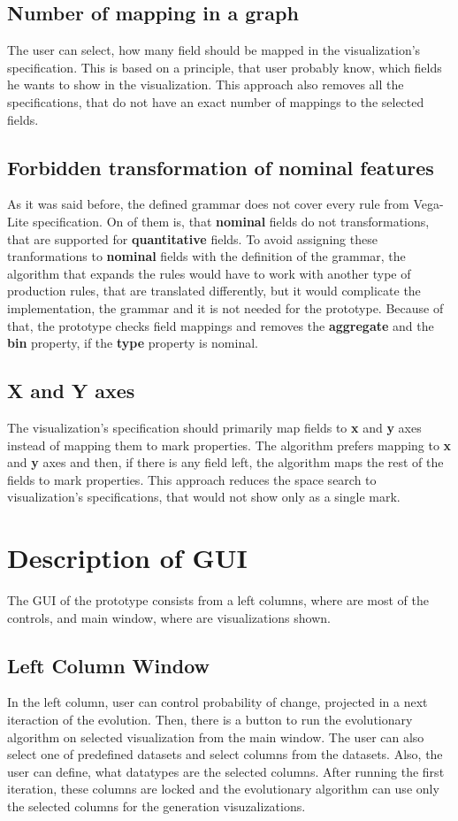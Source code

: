   \subsection{Number of mapping in a graph}
  The user can select, how many field should be mapped in the visualization's specification. This is based on a principle, that user probably know, which fields he wants to show in the visualization. This approach also removes all the specifications, that do not have an exact number of mappings to the selected fields.
  \subsection{Forbidden transformation of nominal features}
  As it was said before, the defined grammar does not cover every rule from Vega-Lite specification. On of them is, that \textbf{nominal} fields do not transformations, that are supported for \textbf{quantitative} fields. To avoid assigning these tranformations to \textbf{nominal} fields with the definition of the grammar, the algorithm that expands the rules would have to work with another type of production rules, that are translated differently, but it would complicate the implementation, the grammar and it is not needed for the prototype. Because of that, the prototype checks field mappings and removes the \textbf{aggregate} and the \textbf{bin} property, if the \textbf{type} property is nominal.
  \subsection{X and Y axes}
  The visualization's specification should primarily map fields to \textbf{x} and \textbf{y} axes instead of mapping them to mark properties. The algorithm prefers mapping to \textbf{x} and \textbf{y} axes and then, if there is any field left, the algorithm maps the rest of the fields to mark properties. This approach reduces the space search to visualization's specifications, that would not show only as a single mark.

  \section{Description of GUI}
  The GUI of the prototype consists from a left columns, where are most of the controls, and main window, where are visualizations shown.
    \subsection{Left Column Window}
    In the left column, user can control probability of change, projected in a next iteraction of the evolution. Then, there is a button to run the evolutionary algorithm on selected visualization from the main window. The user can also select one of predefined datasets and select columns from the datasets. Also, the user can define, what datatypes are the selected columns. After running the first iteration, these columns are locked and the evolutionary algorithm can use only the selected columns for the generation visuzalizations.

